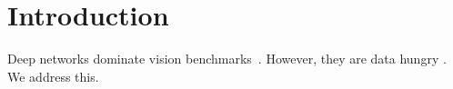 \section{Introduction}
Deep networks dominate vision benchmarks~\cite{smith2020,jones2019}.
However, they are data hungry \cite{lee2021}. We address this.
